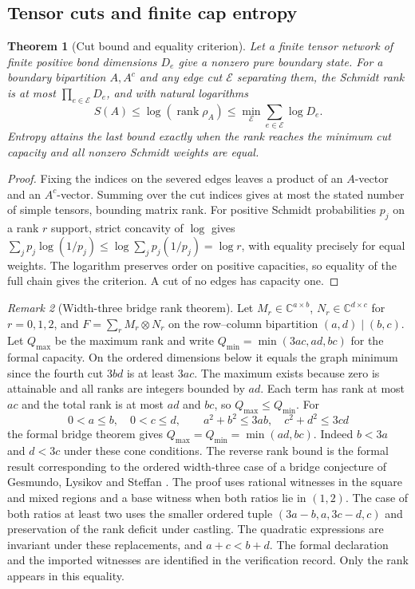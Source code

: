 \documentclass[aps,pra,onecolumn,superscriptaddress,nofootinbib,10pt]{revtex4-2}
\newtheorem{theorem}{Theorem}
\theoremstyle{definition}
\theoremstyle{remark}
\newtheorem{remark}[theorem]{Remark}
\begin{document}
\subsection{Tensor cuts and finite cap entropy}

\begin{theorem}[Cut bound and equality criterion]\label{ub:cut}
Let a finite tensor network of finite positive bond dimensions
$D_e$ give a nonzero pure boundary state. For a boundary bipartition
$A,A^c$ and any edge cut $\mathcal E$ separating them, the Schmidt
rank is at most $\prod_{e\in\mathcal E}D_e$, and with natural
logarithms
\[
 S(A)\le\log(\operatorname{rank}\rho_A)
         \le\min_{\mathcal E}\sum_{e\in\mathcal E}\log D_e.
\]
Entropy attains the last bound exactly when the rank reaches the
minimum cut capacity and all nonzero Schmidt weights are equal.
\end{theorem}
\begin{proof}
Fixing the indices on the severed edges leaves a product of an
$A$-vector and an $A^c$-vector. Summing over the cut indices gives
at most the stated number of simple tensors, bounding matrix rank.
For positive Schmidt probabilities $p_j$ on a rank $r$ support,
strict concavity of $\log$ gives
$\sum_j p_j\log(1/p_j)\le\log\sum_jp_j(1/p_j)=\log r$,
with equality precisely for equal weights. The logarithm preserves
order on positive capacities, so equality of the full chain gives
the criterion. A cut of no edges has capacity one.
\end{proof}

\begin{remark}[Width-three bridge rank theorem]\label{ub:bridge}
Let $M_r\in\mathbb C^{a\times b}$,
$N_r\in\mathbb C^{d\times c}$ for $r=0,1,2$, and
$F=\sum_rM_r\otimes N_r$ on the row--column bipartition
$(a,d)\mid(b,c)$. Let $Q_{\max}$ be the maximum rank and
write $Q_{\min}=\min(3ac,ad,bc)$ for the formal capacity.
On the ordered dimensions below it equals the graph minimum since
the fourth cut $3bd$ is at least $3ac$. The maximum exists
because zero is attainable and all ranks are integers bounded by
$ad$. Each term has rank at most $ac$ and the total rank is at most
$ad$ and $bc$, so $Q_{\max}\le Q_{\min}$. For
\[
 0<a\le b,\quad 0<c\le d,\qquad
 a^2+b^2\le3ab,\quad c^2+d^2\le3cd
\]
the formal bridge theorem gives $Q_{\max}=Q_{\min}=\min(ad,bc)$.
Indeed $b<3a$ and $d<3c$ under these cone conditions. The reverse
rank bound is the formal result corresponding to the ordered
width-three case of a bridge conjecture of Gesmundo, Lysikov and
Steffan \cite{ub:gls}. The proof uses rational witnesses
in the square and mixed regions and a base witness when both
ratios lie in $(1,2)$. The case of both ratios at least two uses
the smaller ordered tuple $(3a-b,a,3c-d,c)$ and preservation of the
rank deficit under castling. The quadratic expressions are invariant
under these replacements, and $a+c<b+d$. The formal declaration and
the imported witnesses are identified in the verification record. \cite{ub:lean}
Only the rank appears in this equality.
\end{remark}
\end{document}
